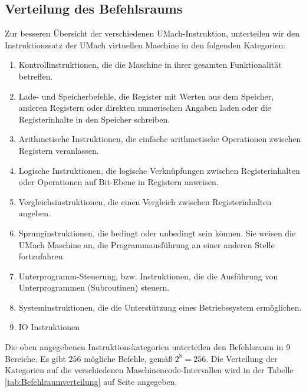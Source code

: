 \subsection{Verteilung des Befehlsraums}
Zur besseren Übersicht der verschiedenen UMach-Instruktion, unterteilen
wir den Instruktionssatz der UMach virtuellen Maschine in den folgenden
Kategorien:

\begin{enumerate}
  \item Kontrollinstruktionen,  die die Maschine in ihrer gesamten
    Funktionalität betreffen.
  \item Lade- und Speicherbefehle, die Register mit Werten aus dem Speicher, 
    anderen Registern oder direkten numerischen Angaben laden oder die
    Registerinhalte in den Speicher schreiben.
  \item Arithmetische Instruktionen, die einfache arithmetische Operationen
    zwischen Registern veranlassen.
  \item Logische Instruktionen, die logische Verknüpfungen zwischen
    Registerinhalten oder Operationen auf Bit-Ebene in Registern anweisen.
  \item Vergleichsinstruktionen, die einen Vergleich zwischen
    Registerinhalten angeben.
  \item Sprunginstruktionen, die bedingt oder unbedingt sein können.
    Sie weisen die UMach Maschine an, die Programmausführung an einer anderen
    Stelle fortzufahren.
  \item Unterprogramm-Steuerung, bzw. Instruktionen, die die Ausführung von
    Unterprogrammen (Subroutinen) steuern.
  \item Systeminstruktionen, die die Unterstützung eines
    Betriebssystem ermöglichen.
  \item IO Instruktionen
\end{enumerate}

Die oben angegebenen Instruktionskategorien unterteilen den Befehlsraum in
9 Bereiche. Es gibt $256$ mögliche Befehle, gemäß $2^{8} = 256$.
Die Verteilung der Kategorien auf die verschiedenen Maschinencode-Intervallen
wird in der Tabelle \ref{tab:Befehlraumverteilung} auf Seite
\pageref{tab:Befehlraumverteilung} angegeben.

